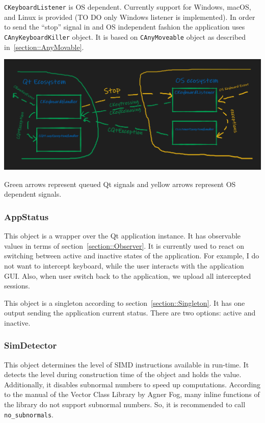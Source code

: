\documentclass{article}
\begin{document}
\verb"CKeyboardListener" is OS dependent. Currently support for Windows, macOS, and Linux is provided (TO DO only Windows listener is implemented). In order to send the ``stop'' signal in and OS independent fashion the application uses \verb"CAnyKeyboardKiller" object. It is based on \verb"CAnyMoveable" object as described in~\ref{section::AnyMovable}.

\begin{center}
\includegraphics[scale = 0.5]{Figures/KeyboardInterception.png}

Green arrows represent queued Qt signals and yellow arrows represent OS dependent signals.
\end{center}

\subsubsection{AppStatus}

This object is a wrapper over the Qt application instance. It has observable values in terms of section~\ref{section::Observer}. It is currently used to react on switching between active and inactive states of the application. For example, I do not want to intercept keyboard, while the user interacts with the application GUI. Also, when user switch back to the application, we upload all intercepted sessions.


This object is a singleton according to section~\ref{section::Singleton}. It has one output sending the application current status. There are two options: active and inactive.

\subsubsection{SimDetector}

This object determines the level of SIMD instructions available in run-time. It detects the level during construction time of the object and holds the value. Additionally, it disables subnormal numbers to speed up computations. According to the manual of the Vector Class Library by Agner Fog, many inline functions of the library do not support subnormal numbers. So, it is recommended to call \verb"no_subnormals".
\end{document}
